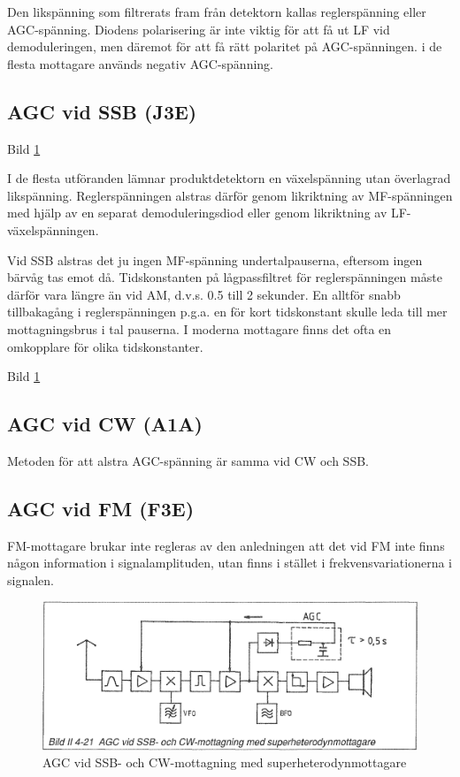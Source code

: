 Den likspänning som filtrerats fram från detektorn kallas
reglerspänning eller AGC-spänning. Diodens polarisering är inte viktig
för att få ut LF vid demoduleringen, men däremot för att få rätt
polaritet på AGC-spänningen. i de flesta mottagare används negativ
AGC-spänning.

\subsection{AGC vid SSB (J3E)}

Bild \ref{fig:bildII4-21}

I de flesta utföranden lämnar produktdetektorn en växelspänning utan
överlagrad likspänning. Reglerspänningen alstras därför genom
likriktning av MF-spänningen med hjälp av en separat demoduleringsdiod
eller genom likriktning av LF-växelspänningen.

Vid SSB alstras det ju ingen MF-spänning undertalpauserna, eftersom
ingen bärvåg tas emot då. Tidskonstanten på lågpassfiltret för
reglerspänningen måste därför vara längre än vid AM, d.v.s. 0.5 till 2
sekunder. En alltför snabb tillbakagång i reglerspänningen p.g.a. en
för kort tidskonstant skulle leda till mer mottagningsbrus i tal
pauserna. I moderna mottagare finns det ofta en omkopplare för olika
tidskonstanter.

Bild \ref{fig:bildII4-21}

\subsection{AGC vid CW (A1A)}

Metoden för att alstra AGC-spänning är samma vid CW och SSB.

\subsection{AGC vid FM (F3E)}

FM-mottagare brukar inte regleras av den anledningen att det vid FM
inte finns någon information i signalamplituden, utan finns i stället
i frekvensvariationerna i signalen.

\begin{figure}
  \includegraphics[width=\textwidth]{images/bild_2_4-21}
  \caption{AGC vid SSB- och CW-mottagning med superheterodynmottagare}
  \label{fig:bildII4-21}
\end{figure}

